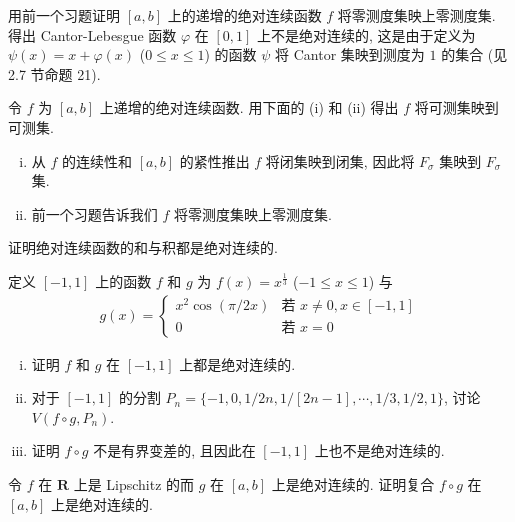\documentclass[../../main.tex]{subfiles}
\begin{document}
\begin{exercise}\label{exercise:ch06-40}
用前一个习题证明 $[a,b]$ 上的递增的绝对连续函数 $f$ 将零测度集映上零测度集. 得出 Cantor-Lebesgue 函数 $\varphi$ 在 $[0,1]$ 上不是绝对连续的, 这是由于定义为 $\psi(x)=x+\varphi(x)$ ($0\leqslant x\leqslant 1$) 的函数 $\psi$ 将 Cantor 集映到测度为 $1$ 的集合 (见 2.7 节命题 21).
\end{exercise}

\begin{exercise}\label{exercise:ch06-41}
令 $f$ 为 $[a,b]$ 上递增的绝对连续函数. 用下面的 (i) 和 (ii) 得出 $f$ 将可测集映到可测集.
\begin{enumerate}[(i)]
\item 从 $f$ 的连续性和 $[a,b]$ 的紧性推出 $f$ 将闭集映到闭集, 因此将 $F_{\sigma}$ 集映到 $F_{\sigma}$ 集.
\item 前一个习题告诉我们 $f$ 将零测度集映上零测度集.
\end{enumerate}
\end{exercise}

\begin{exercise}\label{exercise:ch06-42}
证明绝对连续函数的和与积都是绝对连续的.
\end{exercise}

\begin{exercise}\label{exercise:ch06-43}
定义 $[-1,1]$ 上的函数 $f$ 和 $g$ 为 $f(x)=x^{\frac{1}{3}}$ ($-1\leqslant x\leqslant 1$) 与
\begin{align*}
g(x)=
\begin{cases}
x^{2}\cos(\pi/2x)&\text{若 }x\neq 0,x\in[-1,1]\\
0&\text{若 }x=0
\end{cases}
\end{align*}
\begin{enumerate}[(i)]
\item 证明 $f$ 和 $g$ 在 $[-1,1]$ 上都是绝对连续的.
\item 对于 $[-1,1]$ 的分割 $P_{n}=\{-1,0,1/2n,1/[2n-1],\cdots,1/3,1/2,1\}$, 讨论 $V(f\circ g,P_{n})$.
\item 证明 $f\circ g$ 不是有界变差的, 且因此在 $[-1,1]$ 上也不是绝对连续的.
\end{enumerate}
\end{exercise}

\begin{exercise}\label{exercise:ch06-44}
令 $f$ 在 $\mathbf{R}$ 上是 Lipschitz 的而 $g$ 在 $[a,b]$ 上是绝对连续的. 证明复合 $f\circ g$ 在 $[a,b]$ 上是绝对连续的.
\end{exercise}
\end{document}
